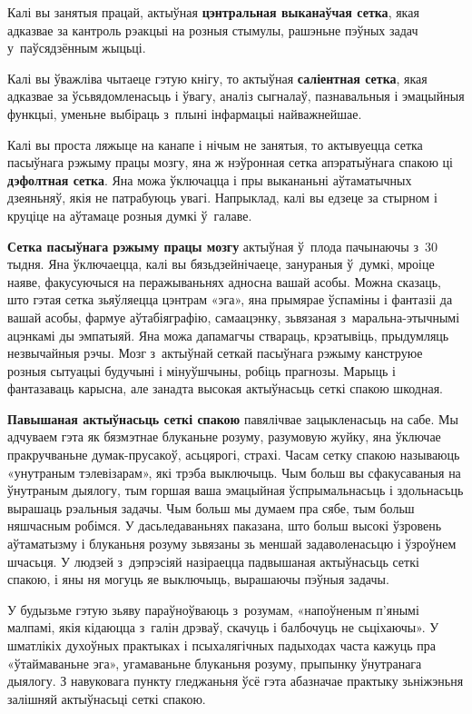 Калі вы занятыя працай, актыўная \textbf{цэнтральная выканаўчая сетка}, якая адказвае за кантроль рэакцыі на розныя стымулы, рашэньне пэўных задач у~паўсядзённым жыцьці.

Калі вы ўважліва чытаеце гэтую кнігу, то актыўная \textbf{саліентная сетка}, якая адказвае за ўсьвядомленасьць і ўвагу, аналіз сыгналаў, пазнавальныя і эмацыйныя функцыі, уменьне выбіраць з~плыні інфармацыі найважнейшае.

Калі вы проста ляжыце на канапе і нічым не занятыя, то актывуецца сетка пасыўнага рэжыму працы мозгу, яна ж нэўронная сетка апэратыўнага спакою ці \textbf{дэфолтная сетка}. Яна можа ўключацца і пры выкананьні аўтаматычных дзеяньняў, якія не патрабуюць увагі. Напрыклад, калі вы едзеце за стырном і круціце на аўтамаце розныя думкі ў~галаве.

\textbf{Сетка пасыўнага рэжыму працы мозгу} актыўная ў~плода пачынаючы з~30 тыдня. Яна ўключаецца, калі вы бязьдзейнічаеце, занураныя ў~думкі, мроіце наяве, факусуючыся на перажываньнях адносна вашай асобы. Можна сказаць, што гэтая сетка зьяўляецца цэнтрам «эга», яна прымярае ўспаміны і фантазіі да вашай асобы, фармуе аўтабіяграфію, самаацэнку, зьвязаная з~маральна-этычнымі ацэнкамі ды эмпатыяй. Яна можа дапамагчы ствараць, крэатывіць, прыдумляць незвычайныя рэчы. Мозг з~актыўнай сеткай пасыўнага рэжыму канструюе розныя сытуацыі будучыні і мінуўшчыны, робіць прагнозы. Марыць і фантазаваць карысна, але занадта высокая актыўнасьць сеткі спакою шкодная.

\textbf{Павышаная актыўнасьць сеткі спакою} павялічвае зацыкленасьць на сабе. Мы адчуваем гэта як бязмэтнае блуканьне розуму, разумовую жуйку, яна ўключае пракручваньне думак-прусакоў, асьцярогі, страхі. Часам сетку спакою называюць «унутраным тэлевізарам», які трэба выключыць. Чым больш вы сфакусаваныя на ўнутраным дыялогу, тым горшая ваша эмацыйная ўспрымальнасьць і здольнасьць вырашаць рэальныя задачы. Чым больш мы думаем пра сябе, тым больш няшчасным робімся. У дасьледаваньнях паказана, што больш высокі ўзровень аўтаматызму і блуканьня розуму зьвязаны зь меншай задаволенасьцю і ўзроўнем шчасьця. У людзей з~дэпрэсіяй назіраецца падвышаная актыўнасьць сеткі спакою, і яны ня могуць яе выключыць, вырашаючы пэўныя задачы.

У будызьме гэтую зьяву параўноўваюць з~розумам, «напоўненым п'янымі малпамі, якія кідаюцца з~галін дрэваў, скачуць і балбочуць не сьціхаючы». У шматлікіх духоўных практыках і псыхалягічных падыходах часта кажуць пра «ўтаймаваньне эга», угамаваньне блуканьня розуму, прыпынку ўнутранага дыялогу. З навуковага пункту гледжаньня ўсё гэта абазначае практыку зьніжэньня залішняй актыўнасьці сеткі спакою.

